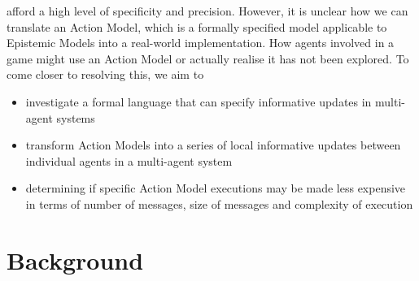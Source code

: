 \documentclass[12pt, a4paper]{article}
\begin{document}
afford a high level of specificity and precision.
However, it is unclear how we can translate an Action Model, which is a formally
specified model applicable to Epistemic Models into a real-world implementation.
How agents involved in a game might use an Action Model or actually realise it
has not been explored.
To come closer to resolving this, we aim to
\begin{itemize}
  \item investigate a formal language that can specify informative updates in
  multi-agent systems
  \item transform Action Models into a series of local informative updates
  between individual agents in a multi-agent system
  \item determining if specific Action Model executions may be made less expensive in
  terms of number of messages, size of messages and complexity of execution
\end{itemize}

\section*{Background}
\end{document}
